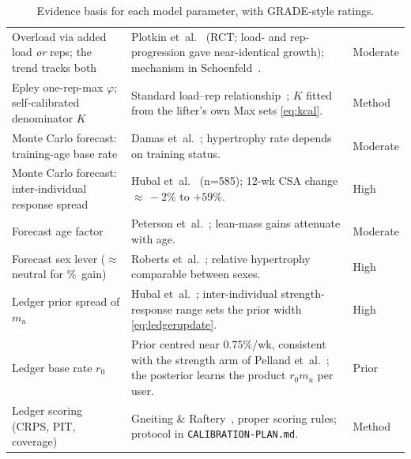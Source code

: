 \documentclass[11pt,a4paper]{article}
\begin{document}
\begin{table}[!htb]
\begin{tabular}{@{}p{4.6cm}p{7.8cm}p{1.5cm}@{}}
Overload via added load \emph{or} reps; the trend tracks both & Plotkin et~al.~\cite{plotkin} (RCT; load- and rep-progression gave near-identical growth); mechanism in Schoenfeld~\cite{sch10}. & Moderate\\
Epley one-rep-max $\varphi$; self-calibrated denominator $K$ & Standard load--rep relationship~\cite{epley}; $K$ fitted from the lifter's own Max sets \eqref{eq:kcal}. & Method\\
Monte Carlo forecast: training-age base rate & Damas et~al.~\cite{damas}; hypertrophy rate depends on training status. & Moderate\\
Monte Carlo forecast: inter-individual response spread & Hubal et~al.~\cite{hubal} (n=585); 12-wk CSA change ${\approx}\,{-}2\%$ to $+59\%$. & High\\
Forecast age factor & Peterson et~al.~\cite{peterson}; lean-mass gains attenuate with age. & Moderate\\
Forecast sex lever ($\approx$ neutral for \%\ gain) & Roberts et~al.~\cite{roberts}; relative hypertrophy comparable between sexes. & High\\
\midrule
Ledger prior spread of $m_u$ & Hubal et~al.~\cite{hubal}; inter-individual strength-response range sets the prior width \eqref{eq:ledgerupdate}. & High\\
Ledger base rate $r_0$ & Prior centred near $0.75\%$/wk, consistent with the strength arm of Pelland et~al.~\cite{drr}; the posterior learns the product $r_0 m_u$ per user. & Prior\\
Ledger scoring (CRPS, PIT, coverage) & Gneiting \& Raftery~\cite{gneiting}, proper scoring rules; protocol in \texttt{CALIBRATION-PLAN.md}. & Method\\
\bottomrule
\end{tabular}
\caption{Evidence basis for each model parameter, with GRADE-style ratings.}\label{tab:basis}
\end{table}
\end{document}
